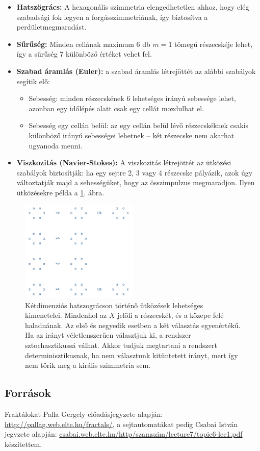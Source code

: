 \documentclass[12pt]{article}
\theoremstyle{plain}
\begin{document}
\begin{itemize}
\item \textbf{Hatszögrács:} A hexagonális szimmetria elengedhetetlen ahhoz, hogy elég szabadsági fok legyen a forgásszimmetriának, így biztosítva a perdületmegmaradást.
\item \textbf{Sűrűség:} Minden cellának maximum 6 db $m=1$ tömegű részecskéje lehet, így a sűrűség 7 különböző értéket vehet fel.
\item \textbf{Szabad áramlás (Euler):} a szabad áramlás létrejöttét az alábbi szabályok segítik elő:
\begin{itemize}
\item Sebesség: minden részecskének 6 lehetséges irányú sebessége lehet, azonban egy időlépés alatt csak egy cellát mozdulhat el. 
\item Sebesség egy cellán belül: az egy cellán belül lévő részecskéknek csakis különböző irányú sebességei lehetnek -- két részecske nem akarhat ugyanoda menni.
\end{itemize}
\item \textbf{Viszkozitás (Navier-Stokes):} A viszkozitás létrejöttét	az ütközési szabályok biztosítják: ha egy sejtre 2, 3 vagy 4 részecske pályázik, azok úgy változtatják majd a sebességüket, hogy az összimpulzus megmaradjon. Ilyen ütközésekre példa a \ref{fig:hexalattice}. ábra.

\end{itemize}

	
\begin{figure}[H]
    \begin{center}
    \includegraphics[width=0.5\textwidth]{media/hexalattice.png}
    \caption{Kétdimenziós hatszográcson történő ütközések lehetséges kimenetelei. Mindenhol az $X$ jelöli a részecskét, és a közepe felé haladnának. Az első és negyedik esetben a két választás egyenértékű. Ha az irányt véletlenszerűen választjuk ki, a rendszer sztochasztikussá válhat. Akkor tudjuk megtartani a rendszert determinisztikusnak, ha nem választunk kitüntetett irányt, mert így nem törik meg a királis szimmetria sem.}
    \label{fig:hexalattice}
    \end{center}
\end{figure}


\subsection*{Források} 
Fraktálokat Palla Gergely előadásjegyzete alapján: \url{http://pallag.web.elte.hu/fractals/}, a sejtautomatákat pedig Csabai István jegyzete alapján: \url{csabai.web.elte.hu/http/szamszim/lecture7/topic6-lec1.pdf} készítettem.

\end{document}
